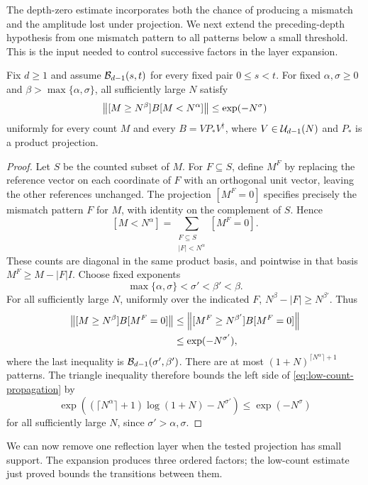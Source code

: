 The depth-zero estimate incorporates both the chance of producing a
mismatch and the amplitude lost under projection. We next extend the
preceding-depth hypothesis from one mismatch pattern to all patterns
below a small threshold. This is the input needed to control successive
factors in the layer expansion.

\begin{lemma}\label{lem:propagation}
Fix $d\ge1$ and assume $\mathcal B_{d-1}(s,t)$ for every fixed pair
$0\le s<t$. For fixed $\alpha,\sigma\ge0$ and
$\beta>\max\{\alpha,\sigma\}$, all sufficiently large $N$
satisfy
\begin{equation}\label{eq:low-count-propagation}
 \left\lVert [M\ge N^\beta]B[M<N^\alpha]\right\rVert
 \le \exp(-N^\sigma)
\end{equation}
uniformly for every count $M$ and every
$B=VP_*V^\dagger$, where $V\in\mathcal U_{d-1}(N)$ and $P_*$
is a product projection.
\end{lemma}

\begin{proof}
Let $S$ be the counted subset of $M$. For $F\subseteq S$,
define $M^F$ by replacing the reference vector on each coordinate
of $F$ with an orthogonal unit vector, leaving the other references
unchanged. The projection $[M^F=0]$ specifies precisely the
mismatch pattern $F$ for $M$, with identity on the complement
of $S$. Hence
\[
 [M<N^\alpha]=\sum_{\substack{F\subseteq S\\ |F|<N^\alpha}}
 [M^F=0].
\]
These counts are diagonal in the same product basis, and pointwise
in that basis $M^F\ge M-|F|I$. Choose fixed exponents
\[
 \max\{\alpha,\sigma\}<\sigma'<\beta'<\beta.
\]
For all sufficiently large $N$, uniformly over the indicated $F$,
$N^\beta-|F|\ge N^{\beta'}$. Thus
\begin{align*}
 \left\lVert [M\ge N^\beta]B[M^F=0]\right\rVert
 &\le\left\lVert [M^F\ge N^{\beta'}]B[M^F=0]\right\rVert\\
 &\le\exp(-N^{\sigma'}),
\end{align*}
where the last inequality is $\mathcal B_{d-1}(\sigma',\beta')$.
There are at most $(1+N)^{\lceil N^\alpha\rceil+1}$ patterns.
The triangle inequality therefore bounds the left side of
\eqref{eq:low-count-propagation} by
\[
 \exp\!\left((\lceil N^\alpha\rceil+1)\log(1+N)
                 -N^{\sigma'}\right)
 \le\exp(-N^\sigma)
\]
for all sufficiently large $N$, since $\sigma'>\alpha,\sigma$.
\end{proof}

We can now remove one reflection layer when the tested projection has
small support. The expansion produces three ordered factors; the
low-count estimate just proved bounds the transitions between them.


